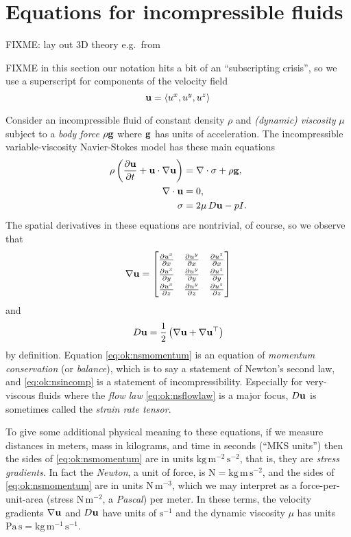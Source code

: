 
\section{Equations for incompressible fluids}

FIXME: lay out 3D theory e.g.~from \citep{Acheson1990,Fowler1997}

FIXME in this section our notation hits a bit of an ``subscripting crisis'', so we use a superscript for components of the velocity field
    $$\mathbf{u} = \left<u^x,u^y,u^z\right>$$

Consider an incompressible fluid of constant density $\rho$ and \emph{(dynamic) viscosity} $\mu$ subject to a \emph{body force} $\rho \mathbf{g}$ where $\mathbf{g}$ has units of acceleration.  The incompressible variable-viscosity Navier-Stokes model has these main equations
\begin{align}
\rho \left(\frac{\partial \mathbf{u}}{\partial t} + \mathbf{u} \cdot \nabla \mathbf{u}\right) &= \nabla\cdot \sigma + \rho \mathbf{g}, \label{eq:ok:nsmomentum} \\
\nabla\cdot \mathbf{u} &= 0, \label{eq:ok:nsincomp} \\
\sigma &= 2 \mu\, D \mathbf{u} - p I. \label{eq:ok:nsflowlaw}
\end{align}
The spatial derivatives in these equations are nontrivial, of course, so we observe that
\begin{equation}
\grad \bu = \renewcommand{\arraystretch}{1.3}\begin{bmatrix}
    \frac{\partial u^x}{\partial x} & \frac{\partial u^y}{\partial x} & \frac{\partial u^z}{\partial x} \\
    \frac{\partial u^x}{\partial y} & \frac{\partial u^y}{\partial y} & \frac{\partial u^z}{\partial y} \\
    \frac{\partial u^x}{\partial z} & \frac{\partial u^y}{\partial z} & \frac{\partial u^z}{\partial z}
    \end{bmatrix}  \label{eq:ok:gradudefinition}
\end{equation}
and
    $$D \mathbf{u} = \frac{1}{2} \left(\nabla \mathbf{u} + \nabla \mathbf{u}^{\top}\right)$$
by definition.  Equation \eqref{eq:ok:nsmomentum} is an equation of \emph{momentum conservation} (or \emph{balance}), which is to say a statement of Newton's second law, and \eqref{eq:ok:nsincomp} is a statement of incompressibility.  Especially for very-viscous fluids where the \emph{flow law} \eqref{eq:ok:nsflowlaw} is a major focus, $D\mathbf{u}$ is sometimes called the \emph{strain rate tensor}.

To give some additional physical meaning to these equations, if we measure distances in meters, mass in kilograms, and time in seconds (``MKS units'') then the sides of \eqref{eq:ok:nsmomentum} are in units $\text{kg}\, \text{m}^{-2}\, \text{s}^{-2}$, that is, they are \emph{stress gradients}.  In fact the \emph{Newton}, a unit of force, is $\text{N}=\text{kg}\, \text{m}\, \text{s}^{-2}$, and the sides of \eqref{eq:ok:nsmomentum} are in units $\text{N}\, \text{m}^{-3}$, which we may interpret as a force-per-unit-area (stress $\text{N}\, \text{m}^{-2}$, a \emph{Pascal}) per meter.  In these terms, the velocity gradients $\nabla \mathbf{u}$ and $D\mathbf{u}$ have units of $\text{s}^{-1}$ and the dynamic viscosity $\mu$ has units $\text{Pa}\, \text{s} = \text{kg}\, \text{m}^{-1}\, \text{s}^{-1}$. \label{page:ok:units}

